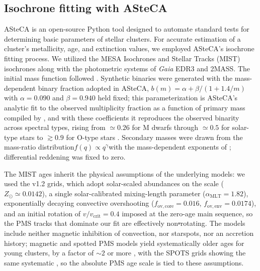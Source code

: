 \documentclass{aa}
\providecommand{\DIFaddtex}[1]{{\protect\color{red}\uwave{#1}}} %
\providecommand{\DIFdeltex}[1]{{\protect\color{red}\sout{#1}}} %
\providecommand{\DIFaddbegin}{} %
\providecommand{\DIFaddend}{} %
\providecommand{\DIFdelbegin}{} %
\providecommand{\DIFdelend}{} %
\providecommand{\DIFadd}[1]{\texorpdfstring{\DIFaddtex{#1}}{#1}} %
\providecommand{\DIFdel}[1]{\texorpdfstring{\DIFdeltex{#1}}{}} %
\providecommand{\DIFscaledelfig}{0.5}
\newlength{\DIFdelgraphicswidth} %
\newlength{\DIFdelgraphicsheight} %
\providecommand{\DIFaddincludegraphics}[2][]{{\color{blue}\fbox{\DIFOincludegraphics[#1]{#2}}}} %
\providecommand{\DIFdelincludegraphics}[2][]{%
\sbox{\DIFdelgraphicsbox}{\DIFOincludegraphics[#1]{#2}}%
\settoboxwidth{\DIFdelgraphicswidth}{\DIFdelgraphicsbox} %
\settoboxtotalheight{\DIFdelgraphicsheight}{\DIFdelgraphicsbox} %
\scalebox{\DIFscaledelfig}{%
\parbox[b]{\DIFdelgraphicswidth}{\usebox{\DIFdelgraphicsbox}\\[-\baselineskip] \rule{\DIFdelgraphicswidth}{0em}}\llap{\resizebox{\DIFdelgraphicswidth}{\DIFdelgraphicsheight}{%
\setlength{\unitlength}{\DIFdelgraphicswidth}%
\begin{picture}(1,1)%
\thicklines\linethickness{2pt} %
{\color[rgb]{1,0,0}\put(0,0){\framebox(1,1){}}}%
{\color[rgb]{1,0,0}\put(0,0){\line( 1,1){1}}}%
{\color[rgb]{1,0,0}\put(0,1){\line(1,-1){1}}}%
\end{picture}%
}\hspace*{3pt}}} %
} %
\DeclareRobustCommand{\DIFaddbegin}{\DIFOaddbegin \let\includegraphics\DIFaddincludegraphics} %
\DeclareRobustCommand{\DIFaddend}{\DIFOaddend \let\includegraphics\DIFOincludegraphics} %
\DeclareRobustCommand{\DIFdelbegin}{\DIFOdelbegin \let\includegraphics\DIFdelincludegraphics} %
\DeclareRobustCommand{\DIFdelend}{\DIFOaddend \let\includegraphics\DIFOincludegraphics} %
\begin{document}
\subsection{Isochrone fitting with ASteCA}\label{subsec:asteca}
ASteCA \citep{2015A&A...576A...6P} is an open-source Python tool designed to automate standard tests for determining basic parameters of stellar clusters. For accurate estimation of a cluster's metallicity, age, and extinction values, we employed ASteCA's isochrone fitting process. We utilized the MESA Isochrones and Stellar Tracks (MIST) isochrones \citep{2016ApJS..222....8D, 2016ApJ...823..102C} along with the photometric systems of \textit{Gaia} EDR3 and 2MASS\@. The initial mass function followed \citet{2014ApJ...796...75C}. Synthetic binaries were generated with the mass-dependent binary fraction adopted in ASteCA, $b(m)=\alpha+\beta/(1+1.4/m)$ with $\alpha=0.090$ and $\beta=0.940$ held fixed; this parameterization is ASteCA's analytic fit to the observed multiplicity fraction as a function of primary mass compiled by \citet{2023ASPC..534..275O}, and with these coefficients it reproduces the observed binarity across spectral types, rising from $\simeq0.26$ for M dwarfs through $\simeq0.5$ for solar-type stars to $\gtrsim0.9$ for O-type stars \citep{2013ARA&A..51..269D,2017ApJS..230...15M}. Secondary masses were drawn from the mass-ratio distribution\DIFaddbegin \DIFadd{, }\DIFaddend $f(q)\propto q^{\gamma}$\DIFaddbegin \DIFadd{, }\DIFaddend with the mass-dependent exponents of \citet{2013ARA&A..51..269D}; differential reddening was fixed to zero.

The MIST ages inherit the physical assumptions of the underlying models: we used the v1.2 grids, which adopt solar-scaled abundances on the \citet{2009ARA&A..47..481A} scale ($Z_\odot\simeq0.0142$), a single solar-calibrated mixing-length parameter ($\alpha_{\mathrm{MLT}}=1.82$), exponentially decaying convective overshooting ($f_{\mathrm{ov,core}}=0.016$, $f_{\mathrm{ov,env}}=0.0174$), and an initial rotation of $v/v_{\mathrm{crit}}=0.4$ imposed at the zero-age main sequence, so the PMS tracks that dominate our fit are effectively non\DIFdelbegin \DIFdel{-}\DIFdelend rotating. The models include neither magnetic inhibition of convection, nor starspots, nor an accretion history; magnetic and spotted PMS models yield systematically older ages for young clusters, by a factor of $\sim2$ or more \citep{2016A&A...593A..99F,2015ApJ...807..174S}, with the SPOTS grids showing the same systematic \citep{2020ApJ...891...29S}, so the absolute PMS age scale is tied to these assumptions.
\end{document}
